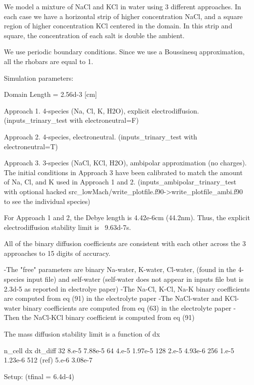 \documentclass[final]{siamltex}
\begin{document}
We model a mixture of NaCl and KCl in water using 3 different approaches.
In each case we have a horizontal strip of higher concentration NaCl,
and a square region of higher concentration KCl centered in the domain.
In this strip and square, the concentration of each salt is double the ambient.

We use periodic boundary conditions.  Since we use a Boussinesq 
approximation, all the rhobars are equal to 1.

Simulation parameters:

Domain Length = 2.56d-3 [cm]

Approach 1.  4-species (Na, Cl, K, H2O), explicit electrodiffusion.
             (inputs\_trinary\_test with electroneutral=F)

Approach 2.  4-species, electroneutral.
             (inputs\_trinary\_test with electroneutral=T)

Approach 3.  3-species (NaCl, KCl, H2O), ambipolar approximation (no charges).
             The initial conditions in Approach 3 have been calibrated to
             match the amount of Na, Cl, and K used in Approach 1 and 2.
             (inputs\_ambipolar\_trinary\_test with optional hacked 
              src\_lowMach/write\_plotfile.f90->write\_plotfile\_ambi.f90
              to see the individual species)

For Approach 1 and 2, the Debye length is 4.42e-6cm (44.2nm).
Thus, the explicit electrodiffusion stability limit is ~9.63d-7s.

All of the binary diffusion coefficients are consistent with each other across
the 3 approaches to 15 digits of accuracy.

  -The "free" parameters are binary Na-water, K-water, Cl-water, (found in the 4-species input file)
   and self-water (self-water does not appear in inputs file but is 2.3d-5 as reported in electrolye paper)
  -The Na-Cl, K-Cl, Na-K binary coefficients are computed from eq (91) in the electrolyte paper
  -The NaCl-water and KCl-water binary coefficients are computed from eq (63) in the electrolyte paper
  -Then the NaCl-KCl binary coefficient is computed from eq (91)

The mass diffusion stability limit is a function of dx

n\_cell       dx       dt\_diff
32           8.e-5    7.88e-5
64           4.e-5    1.97e-5
128          2.e-5    4.93e-6
256          1.e-5    1.23e-6
512 (ref)    5.e-6    3.08e-7

Setup: (tfinal = 6.4d-4)
\end{document}
